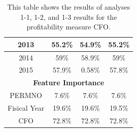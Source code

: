 {{\begin{table}[]
\begin{tabular}{cccc}
\multicolumn{1}{|c|}{2013}                           & \multicolumn{1}{c|}{55.2\%}                      & \multicolumn{1}{c|}{54.9\%}                      & \multicolumn{1}{c|}{55.2\%}                        \\ \hline
\multicolumn{1}{|c|}{2014}                           & \multicolumn{1}{c|}{59\%}                        & \multicolumn{1}{c|}{58.9\%}                      & \multicolumn{1}{c|}{59\%}                          \\ \hline
\multicolumn{1}{|c|}{2015}                           & \multicolumn{1}{c|}{57.9\%}                      & \multicolumn{1}{c|}{0.58\%}                      & \multicolumn{1}{c|}{57.8\%}                        \\ \hline
\multicolumn{4}{|c|}{\textbf{Feature Importance}}                                                                                                                                                               \\ \hline
\multicolumn{1}{|c|}{PERMNO}                         & \multicolumn{1}{c|}{7.6\%}                       & \multicolumn{1}{c|}{7.6\%}                       & \multicolumn{1}{c|}{7.6\%}                         \\ \hline
\multicolumn{1}{|c|}{Fisical Year}                   & \multicolumn{1}{c|}{19.6\%}                      & \multicolumn{1}{c|}{19.6\%}                      & \multicolumn{1}{c|}{19.5\%}                        \\ \hline
\multicolumn{1}{|c|}{CFO}                            & \multicolumn{1}{c|}{72.8\%}                      & \multicolumn{1}{c|}{72.8\%}                      & \multicolumn{1}{c|}{72.8\%}                        \\ \hline
\end{tabular}
\caption{This table shows the results of analyses 1-1, 1-2, and 1-3 results for the profitability measure CFO.}
\label{tab:CFO-1}
\end{table}

}}
